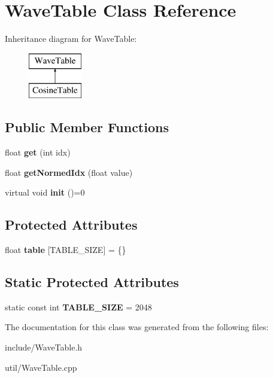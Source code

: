 \hypertarget{classWaveTable}{}\section{Wave\+Table Class Reference}
\label{classWaveTable}
Inheritance diagram for Wave\+Table\+:\begin{figure}[H]
\begin{center}
\leavevmode
\includegraphics[height=2.000000cm]{classWaveTable}
\end{center}
\end{figure}
\subsection*{Public Member Functions}
\begin{DoxyCompactItemize}
\item 
float {\bfseries get} (int idx)\hypertarget{classWaveTable_afd23f7ecfb0b1bfb15164c49b7d9c95e}{}\label{classWaveTable_afd23f7ecfb0b1bfb15164c49b7d9c95e}

\item 
float {\bfseries get\+Normed\+Idx} (float value)\hypertarget{classWaveTable_a3fa4d93994b56dee6f0083e063dd53b5}{}\label{classWaveTable_a3fa4d93994b56dee6f0083e063dd53b5}

\item 
virtual void {\bfseries init} ()=0\hypertarget{classWaveTable_addb817963f443ed6edaba3be9b8edec5}{}\label{classWaveTable_addb817963f443ed6edaba3be9b8edec5}

\end{DoxyCompactItemize}
\subsection*{Protected Attributes}
\begin{DoxyCompactItemize}
\item 
float {\bfseries table} \mbox{[}T\+A\+B\+L\+E\+\_\+\+S\+I\+ZE\mbox{]} = \{\}\hypertarget{classWaveTable_aac70194676deffaf65f02a79f9d49aeb}{}\label{classWaveTable_aac70194676deffaf65f02a79f9d49aeb}

\end{DoxyCompactItemize}
\subsection*{Static Protected Attributes}
\begin{DoxyCompactItemize}
\item 
static const int {\bfseries T\+A\+B\+L\+E\+\_\+\+S\+I\+ZE} = 2048\hypertarget{classWaveTable_ae8fe89b58ec31a5beda1bfc79d1c39ad}{}\label{classWaveTable_ae8fe89b58ec31a5beda1bfc79d1c39ad}

\end{DoxyCompactItemize}


The documentation for this class was generated from the following files\+:\begin{DoxyCompactItemize}
\item 
include/Wave\+Table.\+h\item 
util/Wave\+Table.\+cpp\end{DoxyCompactItemize}

